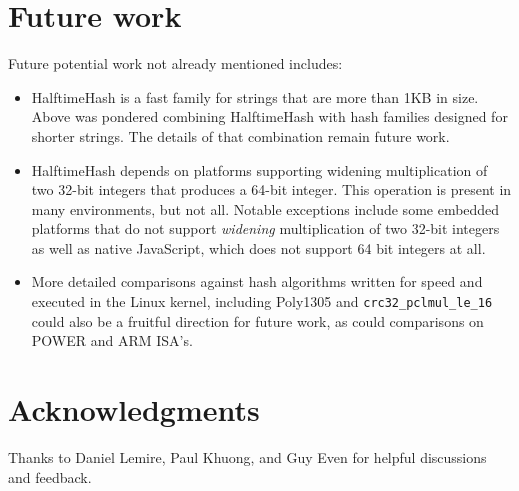 \documentclass[runningheads]{llncs}
\begin{document}




\section{Future work}

Future potential work not already mentioned includes:

\begin{itemize}
\item HalftimeHash is a fast family for strings that are more than 1KB in size.
  Above was pondered combining HalftimeHash with hash families designed for shorter strings.
  The details of that combination remain future work.
\item HalftimeHash depends on platforms supporting widening multiplication of two 32-bit integers that produces a 64-bit integer.
  This operation is present in many environments, but not all.
  Notable exceptions include some embedded platforms that do not support {\em widening} multiplication of two 32-bit integers as well as native JavaScript, which does not support 64 bit integers at all.
\item More detailed comparisons against hash algorithms written for speed and executed in the Linux kernel, including Poly1305 and \texttt{crc32\_pclmul\_le\_16} could also be a fruitful direction for future work, as could comparisons on POWER and ARM ISA's.
\end{itemize}



%

\section*{Acknowledgments}
Thanks to Daniel Lemire, Paul Khuong, and Guy Even for helpful discussions and feedback.
\end{document}
